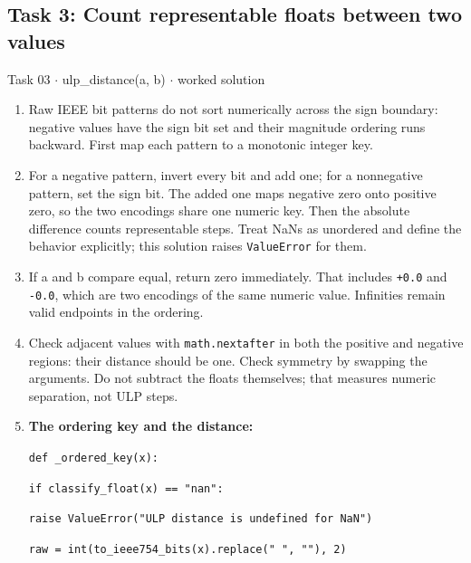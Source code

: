 \documentclass[11pt]{article}
\begin{document}
\begin{keepsection}\subsection{Task 3: Count representable floats between two values}

\begin{workedbox}{Task 03 \ensuremath{\cdot} ulp\_distance(a, b) \ensuremath{\cdot} worked solution}
\begin{enumerate}
\item Raw IEEE bit patterns do not sort numerically across the sign boundary: negative values have the sign bit set and their magnitude ordering runs backward. First map each pattern to a monotonic integer key.
\item For a negative pattern, invert every bit and add one; for a nonnegative pattern, set the sign bit. The added one maps negative zero onto positive zero, so the two encodings share one numeric key. Then the absolute difference counts representable steps. Treat NaNs as unordered and define the behavior explicitly; this solution raises \texttt{ValueError} for them.
\item If a and b compare equal, return zero immediately. That includes \texttt{+0.0} and \texttt{-0.0}, which are two encodings of the same numeric value. Infinities remain valid endpoints in the ordering.
\item Check adjacent values with \texttt{math.nextafter} in both the positive and negative regions: their distance should be one. Check symmetry by swapping the arguments. Do not subtract the floats themselves; that measures numeric separation, not ULP steps.
\item {}
\textbf{The ordering key and the distance:}
\begin{tcolorbox}[colback=Paperblue,colframe=Paperblue,boxrule=0pt,arc=0pt,left=7pt,right=7pt,top=5pt,bottom=5pt]\small\sloppy
\noindent\hspace*{0em}\texttt{def \_ordered\_key(x):}\par
\noindent\hspace*{1em}\texttt{if classify\_float(x) == "nan":}\par
\noindent\hspace*{3em}\texttt{raise ValueError("ULP distance is undefined for NaN")}\par
\noindent\hspace*{1em}\texttt{raw = int(to\_ieee754\_bits(x).replace(" ", ""), 2)}\par

\end{tcolorbox}
\end{enumerate}
\end{workedbox}
\end{keepsection}
\end{document}
